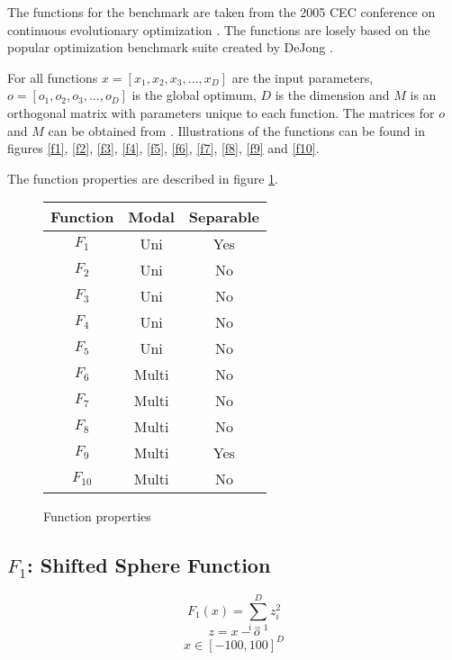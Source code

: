 The functions for the benchmark are taken from the 2005 CEC conference on continuous evolutionary optimization \cite{suganthan2005problem}. The functions are losely based on the popular optimization benchmark suite created by DeJong \cite{Whitley1996245}.

For all functions $x=[x_1,x_2,x_3,...,x_D]$ are the input parameters, $o=[o_1,o_2,o_3,...,o_D]$ is the global optimum, $D$ is the dimension and $M$ is an orthogonal matrix with parameters unique to each function. The matrices for $o$ and $M$ can be obtained from \cite{suganthan2005problem}. Illustrations of the functions can be found in figures \ref{f1}, \ref{f2}, \ref{f3}, \ref{f4}, \ref{f5}, \ref{f6}, \ref{f7}, \ref{f8}, \ref{f9} and \ref{f10}.

The function properties are described in figure \ref{math:prop}.

\begin{figure}[H]
  \centering
  \begin{center}
    \begin{tabular}{ | c | c | c | }
      \hline
      Function & Modal & Separable \\ \hline
      $F_{1}$ & Uni & Yes \\ \hline
      $F_{2}$ & Uni & No \\ \hline
      $F_{3}$ & Uni & No \\ \hline
      $F_{4}$ & Uni & No \\ \hline
      $F_{5}$ & Uni & No \\ \hline
      $F_{6}$ & Multi & No \\ \hline
      $F_{7}$ & Multi & No \\ \hline
      $F_{8}$ & Multi & No \\ \hline
      $F_{9}$ & Multi & Yes \\ \hline
      $F_{10}$ & Multi & No \\

      \hline
    \end{tabular}
  \end{center}
  \caption{Function properties}
  \label{math:prop}
\end{figure}

\subsection{$F_1$: Shifted Sphere Function}

\begin{equation}
  F_1(x)=\sum_{i=1}^{D}{z_i^2}
\end{equation}
\[ z=x-o \]
\[ x \in [-100,100]^D \]

